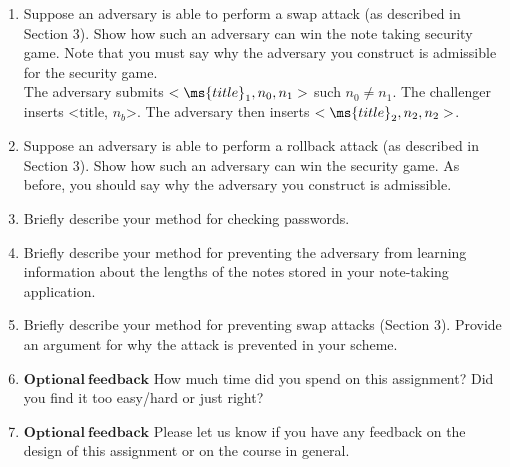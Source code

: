 \documentclass[11pt]{article}
\begin{document}
\newlength{\boxwidth}
\setlength{\boxwidth}{\textwidth}
\addtolength{\boxwidth}{-2cm}
\noindent{}

\begin{enumerate}
  \item Suppose an adversary is able to perform a swap attack (as described in Section 3). Show how such an adversary can win the note taking security game. Note that you must say why the adversary you construct is admissible for the security game.
  \\ The adversary submits $<\ms{title}_1, n_0, n_1>$ such $n_0 \neq n_1$. The challenger inserts <title, $n_b$>. The adversary then inserts $<\ms{title}_2, n_2, n_2>$. 

  \item Suppose an adversary is able to perform a rollback attack (as described in Section 3). Show how
such an adversary can win the security game. As before, you should say why the adversary you
construct is admissible. 
  \item Briefly describe your method for checking passwords.
  \item Briefly describe your method for preventing the adversary from learning information about the
lengths of the notes stored in your note-taking application.

  \item Briefly describe your method for preventing swap attacks (Section 3). Provide an argument for why
the attack is prevented in your scheme.
  \item $\mathbf{Optional\ feedback}$ How much time did you spend on this assignment? Did you find it too easy/hard
or just right?
  \item $\mathbf{Optional  \ feedback}$ Please let us know if you have any feedback on the design of this assignment or
on the course in general.

\end{enumerate}
\end{document}
